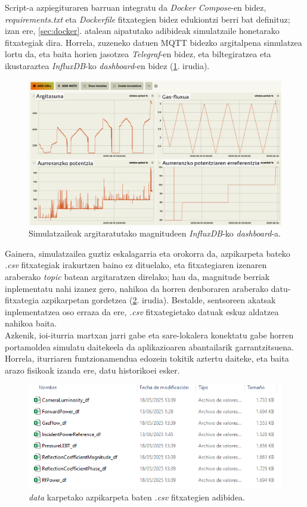 \documentclass[12pt]{article}
\numberwithin{figure}{section}
\numberwithin{equation}{section}
\begin{document}
Script-a azpiegituraren barruan integratu da \textit{Docker Compose}-en bidez, \textit{requirements.txt} eta \textit{Dockerfile} fitxategien bidez edukiontzi berri bat definituz; izan ere, \ref{sec:docker}. atalean aipatutako adibideak simulatzaile honetarako fitxategiak dira. Horrela, zuzeneko datuen MQTT bidezko argitalpena simulatzea lortu da, eta baita horien jasotzea \textit{Telegraf}-en bidez, eta biltegiratzea eta ikustaraztea \textit{InfluxDB}-ko \textit{dashboard}-en bidez (\ref{fig:simulator_dashboard}. irudia).

\begin{figure}[h]
    \centering
    \includegraphics[width=0.92\linewidth]{3 - Neurketak/simulator_dashboard.png}
    \caption{Simulatzaileak argitaratutako magnitudeen \textit{InfluxDB}-ko \textit{dashboard}-a.}
    \label{fig:simulator_dashboard}
\end{figure}

Gainera, simulatzailea guztiz eskalagarria eta orokorra da, azpikarpeta bateko \textit{.csv} fitxategiak irakurtzen baino ez dituelako, eta fitxategiaren izenaren araberako \textit{topic} batean argitaratzen direlako; hau da, magnitude berriak inplementatu nahi izanez gero, nahikoa da horren denboraren araberako datu-fitxategia azpikarpetan gordetzea (\ref{fig:data_magnitude}. irudia). Bestalde, sentsoreen akatsak inplementatzea oso erraza da ere, \textit{.csv} fitxategietako datuak eskuz aldatzea nahikoa baita.\\

Azkenik, ioi-iturria martxan jarri gabe eta sare-lokalera konektatu gabe horren portamoldea simulatu daitekeela da aplikazioaren abantailarik garrantzitsuena. Horrela, iturriaren funtzionamendua edozein tokitik aztertu daiteke, eta baita arazo fisikoak izanda ere, datu historikoei esker.

\begin{figure}[h]
    \centering
    \includegraphics[width=0.65\linewidth]{3 - Neurketak/data_magnitudeak.png}
    \caption{\textit{data} karpetako azpikarpeta baten \textit{.csv} fitxategien adibidea.}
    \label{fig:data_magnitude}
\end{figure}
\newpage
\end{document}
